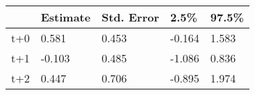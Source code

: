 \begin{tabular}{lllll}
  \toprule
  & Estimate & Std. Error & 2.5\% & 97.5\% \\ 
  \midrule
t+0 & 0.581 & 0.453 & -0.164 & 1.583 \\ 
  t+1 & -0.103 & 0.485 & -1.086 & 0.836 \\ 
  t+2 & 0.447 & 0.706 & -0.895 & 1.974 \\ 
   \bottomrule
\end{tabular}
